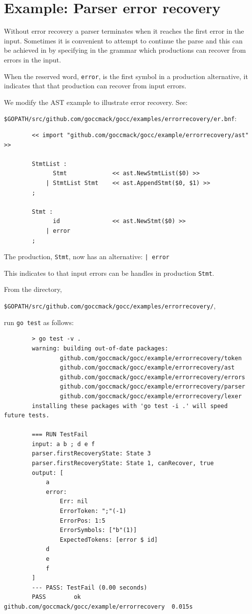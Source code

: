 \documentclass[12pt]{article}
\begin{document}
\section{Example: Parser error recovery} \label{sec:error recovery}
	Without error recovery a \gocc parser terminates when it reaches the first error in the input. Sometimes it is convenient to attempt to continue the parse and this can be achieved in \gocc by specifying in the grammar which productions can recover from errors in the input.

	When the \gocc reserved word, \verb|error|, is the first symbol in a production alternative, it indicates that that production can recover from input errors.

	We modify the AST example to illustrate error recovery. See:

	\verb|$GOPATH/src/github.com/goccmack/gocc/examples/errorrecovery/er.bnf|:

	\begin{verbatim}
		<< import "github.com/goccmack/gocc/example/errorrecovery/ast" >>

		StmtList :
		      Stmt             << ast.NewStmtList($0) >>
		    | StmtList Stmt    << ast.AppendStmt($0, $1) >>
		;

		Stmt :
		      id               << ast.NewStmt($0) >>
		    | error
		;
	\end{verbatim}

	The production, \verb|Stmt|, now has an alternative: \verb"| error"

	This indicates to \gocc that input errors can be handles in production \verb|Stmt|.

	From the directory,

	\verb|$GOPATH/src/github.com/goccmack/gocc/examples/errorrecovery/|,

	run \verb|go test| as follows:

	\begin{verbatim}
		> go test -v .
		warning: building out-of-date packages:
		        github.com/goccmack/gocc/example/errorrecovery/token
		        github.com/goccmack/gocc/example/errorrecovery/ast
		        github.com/goccmack/gocc/example/errorrecovery/errors
		        github.com/goccmack/gocc/example/errorrecovery/parser
		        github.com/goccmack/gocc/example/errorrecovery/lexer
		installing these packages with 'go test -i .' will speed future tests.

		=== RUN TestFail
		input: a b ; d e f
		parser.firstRecoveryState: State 3
		parser.firstRecoveryState: State 1, canRecover, true
		output: [
		    a
		    error:
		        Err: nil
		        ErrorToken: ";"(-1)
		        ErrorPos: 1:5
		        ErrorSymbols: ["b"(1)]
		        ExpectedTokens: [error $ id]
		    d
		    e
		    f
		]
		--- PASS: TestFail (0.00 seconds)
		PASS		ok      github.com/goccmack/gocc/example/errorrecovery	0.015s
	\end{verbatim}
\end{document}

